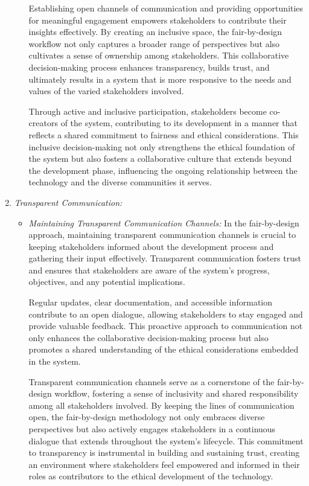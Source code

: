 \documentclass[12pt,a4paper,openright,twoside]{book}
\begin{document}
\begin{enumerate}
\begin{itemize}
        Establishing open channels of communication and providing opportunities for meaningful engagement empowers stakeholders to contribute their insights effectively. By creating an inclusive space, the fair-by-design workflow not only captures a broader range of perspectives but also cultivates a sense of ownership among stakeholders. This collaborative decision-making process enhances transparency, builds trust, and ultimately results in a system that is more responsive to the needs and values of the varied stakeholders involved.
        
        Through active and inclusive participation, stakeholders become co-creators of the system, contributing to its development in a manner that reflects a shared commitment to fairness and ethical considerations. This inclusive decision-making not only strengthens the ethical foundation of the system but also fosters a collaborative culture that extends beyond the development phase, influencing the ongoing relationship between the technology and the diverse communities it serves.

    \end{itemize}
    
    \item \emph{Transparent Communication:}
    
    \begin{itemize}

        \item \emph{Maintaining Transparent Communication Channels:} In the fair-by-design approach, maintaining transparent communication channels is crucial to keeping stakeholders informed about the development process and gathering their input effectively. Transparent communication fosters trust and ensures that stakeholders are aware of the system's progress, objectives, and any potential implications.

        Regular updates, clear documentation, and accessible information contribute to an open dialogue, allowing stakeholders to stay engaged and provide valuable feedback. This proactive approach to communication not only enhances the collaborative decision-making process but also promotes a shared understanding of the ethical considerations embedded in the system.
        
        Transparent communication channels serve as a cornerstone of the fair-by-design workflow, fostering a sense of inclusivity and shared responsibility among all stakeholders involved. By keeping the lines of communication open, the fair-by-design methodology not only embraces diverse perspectives but also actively engages stakeholders in a continuous dialogue that extends throughout the system's lifecycle. This commitment to transparency is instrumental in building and sustaining trust, creating an environment where stakeholders feel empowered and informed in their roles as contributors to the ethical development of the technology.

    \end{itemize}

\end{enumerate}
\end{document}

